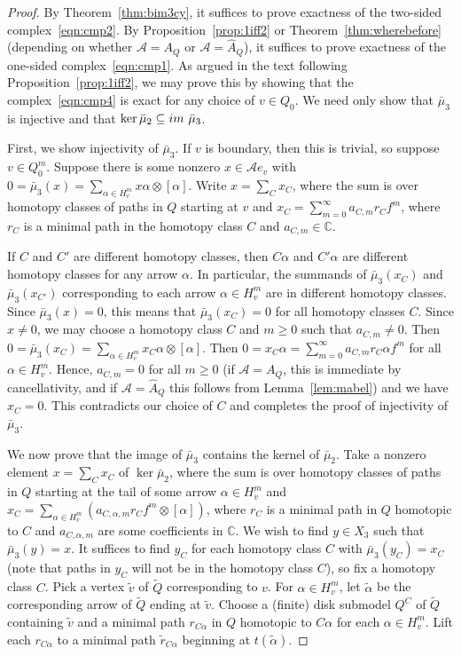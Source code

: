 \documentclass{article}
\theoremstyle{definition}
\newcommand{\A}{{\mathcal A}}
\begin{document}
\begin{proof}
	By Theorem~\ref{thm:bim3cy}, it suffices to prove exactness of the two-sided complex~\eqref{eqn:cmp2}.
	By Proposition~\ref{prop:1iff2} or Theorem~\ref{thm:wherebefore} (depending on whether $\A=A_Q$ or $\A=\widehat A_Q$), it suffices to prove exactness of the one-sided complex~\eqref{eqn:cmp1}. 
	As argued in the text following Proposition~\ref{prop:1iff2}, we may prove this by showing that the complex~\eqref{eqn:cmp4} is exact for any choice of $v\in Q_0$.
	We need only show that $\bar\mu_3$ is injective and that $\ker\bar\mu_2\subseteq\textup{im}\ \bar\mu_3$.

	First, we show injectivity of $\bar\mu_3$. If $v$ is boundary, then this is trivial, so suppose $v\in Q_0^{m}$. Suppose there is some nonzero $x\in\A e_v$ with $0=\bar\mu_3(x)=\sum_{\alpha\in H_v^{m}}x\alpha\otimes[\alpha]$. Write $x=\sum_Cx_C$, where the sum is over homotopy classes of paths in $Q$ starting at $v$ and 
		$x_C=\sum_{m=0}^\infty a_{C,m}r_Cf^m$, where $r_C$ is a minimal path in the homotopy class $C$ and $a_{C,m}\in\mathbb C$. 

		If $C$ and $C'$ are different homotopy classes, then $C\alpha$ and $C'\alpha$ are different homotopy classes for any arrow $\alpha$. In particular, the summands of $\bar\mu_3(x_C)$ and $\bar\mu_3(x_{C'})$ corresponding to each arrow $\alpha\in H_v^{m}$ are in different homotopy classes. 
		Since $\bar\mu_3(x)=0$, this means that $\bar\mu_3(x_C)=0$ for all homotopy classes $C$. Since $x\neq0$, we may choose a homotopy class $C$ and $m\geq0$ such that $a_{C,m}\neq0$.
		{Then $0=\bar\mu_3(x_C)=\sum_{\alpha\in H_v^{m}}x_C\alpha\otimes[\alpha]$. Then $0=x_C\alpha=\sum_{m=0}^\infty a_{C,m}r_C\alpha f^m$ for all $\alpha\in H_v^{m}$.
		Hence, $a_{C,m}=0$ for all $m\geq0$ (if $\A=A_Q$, this is immediate by cancellativity, and if $\A=\widehat A_Q$ this follows from Lemma~\ref{lem:mabel}) and we have $x_C=0$. This contradicts our choice of $C$ and completes the proof of injectivity of $\bar\mu_3$.}

	We now prove that the image of $\bar\mu_3$ contains the kernel of $\bar\mu_2$. 
	Take a nonzero element $x=\sum_Cx_C$ of $\ker\bar\mu_2$, where the sum is over homotopy classes of paths in $Q$ starting at the tail of some arrow $\alpha\in H_v^{m}$ and $x_C=\sum_{\alpha\in H_v^{m}}\left(a_{C,\alpha,m}r_Cf^m\otimes[\alpha]\right)$, where $r_C$ is a minimal path in $Q$ homotopic to $C$ and $a_{C,\alpha,m}$ are some coefficients in $\mathbb C$.
	We wish to find $y\in X_3$ such that $\bar\mu_3(y)=x$. It suffices to find $y_C$ for each homotopy class $C$ with $\bar\mu_3(y_C)=x_C$ (note that paths in $y_C$ will not be in the homotopy class $C$), so fix a homotopy class $C$.
	Pick a vertex $\tilde v$ of $\widetilde Q$ corresponding to $v$. For $\alpha\in H_v^{m}$, let $\tilde\alpha$ be the corresponding arrow of $\widetilde Q$ ending at $\tilde v$. Choose a (finite) disk submodel $Q^C$ of $\widetilde Q$ containing $\tilde v$ and a minimal path $r_{C\alpha}$ in $Q$ homotopic to $C\alpha$ for each $\alpha\in H_v^{m}$. Lift each $r_{C\alpha}$ to a minimal path $\tilde r_{C\alpha}$ beginning at $t(\tilde\alpha)$.


\end{proof}
\end{document}
